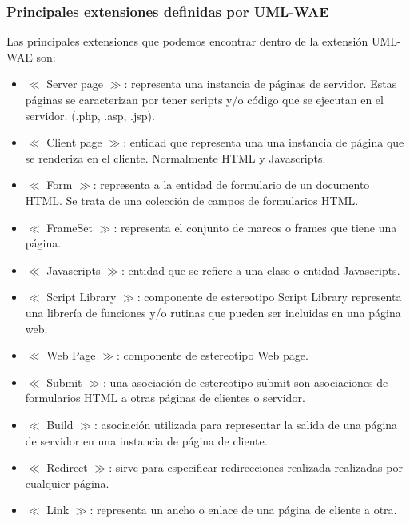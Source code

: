 \subsubsection{Principales extensiones definidas por UML-WAE}

Las principales extensiones que podemos encontrar dentro de la extensión UML-WAE son:
\begin{itemize}
\item $\ll$ Server page $\gg$: representa una instancia de páginas de servidor. Estas páginas se caracterizan por tener scripts y/o código que se ejecutan en el servidor. (.php, .asp, .jsp).
\item $\ll$ Client page $\gg$: entidad que representa una una instancia de página que se renderiza en el cliente. Normalmente HTML y Javascripts.
\item $\ll$ Form $\gg$: representa a la entidad de formulario de un documento HTML. Se trata de una colección de campos de formularios HTML.
\item $\ll$ FrameSet $\gg$: representa el conjunto de marcos o frames que tiene una página.
\item $\ll$ Javascripts $\gg$: entidad que se refiere a una clase o entidad Javascripts.
\item $\ll$ Script Library $\gg$: componente de estereotipo Script Library representa una librería de funciones y/o rutinas que pueden ser incluidas en una página web.
\item $\ll$ Web Page $\gg$: componente de estereotipo Web page.
\item $\ll$ Submit $\gg$: una asociación de estereotipo submit son asociaciones de formularios HTML a otras páginas de clientes o servidor.
\item $\ll$ Build $\gg$: asociación utilizada para representar la salida de una página de servidor en una instancia de página de cliente.
\item $\ll$ Redirect $\gg$: sirve para especificar redirecciones realizada realizadas por cualquier página.
\item $\ll$ Link $\gg$: representa un ancho o enlace de una página de cliente a otra.
\end{itemize}
